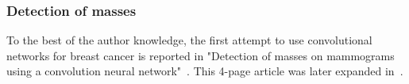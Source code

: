 \subsubsection{Detection of masses}
To the best of the author knowledge, the first attempt to use convolutional networks for breast cancer is reported in "Detection of masses on mammograms using a convolution neural network"~\cite{Wei1995}. This 4-page article was later expanded in~\cite{Sahiner1996}.

\begin{comment} Sahiner1996
- detection of tumors
- uses mass to mean benign or malign tumors (growths of cell with no purpose) and normal tissue is other masses (cysts, liquids, no mass at all, etc)
- 168 mammograms: 168 positive classes, 504 negative classes
- 0.87 AUC, 0.9 sensitivity, 0.69 specificity
- texture "contains useful information that can be used to effectively distinguish masses from normal tissue." Not sure 'bout this
- one output sigmoid
- GD+momentum, adaptive learning rates,  early stopping
- manually extracted ROI's
- "The average size (length of the long axis) of the masses, as estimated by the radiologists, was 12.2 mm., and the standard deviation of the mass size was 4.5
mm." i could use a 2-2.5 cm filter.
- digitized mammograms (not digital)
- For each mamogram, 4 ROIs extracted (a tumor, fatty tissue, dense tissue nad mixed dense/fatty tissue)
- each pixel 0.1 mm
- 256 pixels by 256 pixels initial image (2.56 cm by 2.56 cm)
- background reduction (averaging a 2 by 2 box with an average of 4 cardianl boxes). 
- (Because they didn't have the power) nonoverlapping average pooling (where the avg function is applied instead of the max function) with 16 x 16 filters (rsulting in 16 by 16 image patches) and 8 by 8 filters (resulting in 32 by 32 image patches)
- 8 rotations(0,90,180,270 and flipped). Used all to calculate a single output for training, so all 8 will contribute a single number. Output obtained as average among all of them.
 

\end{comment}
